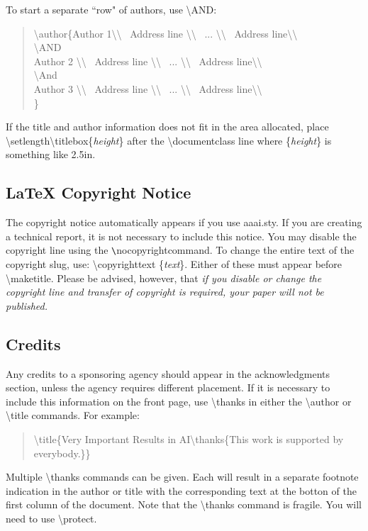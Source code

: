 \documentclass[letterpaper]{article}
\begin{document}
\noindent To start a separate ``row" of authors, use \textbackslash AND:
\begin{quote}
\begin{small}
\textbackslash author\{Author 1\textbackslash\textbackslash ~ Address line \textbackslash\textbackslash ~
...  \textbackslash \textbackslash ~ Address line\textbackslash\textbackslash \\
\textbackslash AND\\
Author 2 \textbackslash\textbackslash ~ Address line \textbackslash\textbackslash ~
...  \textbackslash \textbackslash ~ Address line\textbackslash\textbackslash \\
\textbackslash And\\
Author 3 \textbackslash\textbackslash ~ Address line \textbackslash\textbackslash ~
...  \textbackslash \textbackslash ~ Address line\textbackslash\textbackslash \\\}
\end{small}
\end{quote}

\noindent If the title and author information does not fit in the area allocated, place
\textbackslash setlength\textbackslash titlebox\{\textit{height}\}
after the \textbackslash documentclass line where \{\textit{height}\} is something like 2.5in.

\subsection{\LaTeX{} Copyright Notice}
The copyright notice automatically appears if you use aaai.sty. If you are creating a technical report, it is not necessary to include this notice. You may disable the copyright line using the \verb+\+nocopyrightcommand. To change the entire text of the copyright slug, use:
\textbackslash copyrighttext \{\emph{text}\}.
Either of these must appear before \textbackslash maketitle. Please be advised, however, that \textit{if you disable or change the copyright line and transfer of copyright is required, your paper will not be published.}

\subsection{Credits}
Any credits to a sponsoring agency should appear in the acknowledgments section, unless the agency requires different placement. If it is necessary to include this information on the front page, use
\textbackslash thanks in either the \textbackslash author or \textbackslash title commands.
For example:
\begin{quote}
\begin{small}
\textbackslash title\{Very Important Results in AI\textbackslash thanks\{This work is
 supported by everybody.\}\}
\end{small}
\end{quote}
Multiple \textbackslash thanks commands can be given. Each will result in a separate footnote indication in the author or title with the corresponding text at the botton of the first column of the document. Note that the \textbackslash thanks command is fragile. You will need to use \textbackslash protect.
\end{document}
